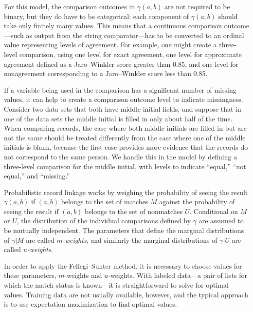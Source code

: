 \documentclass[]{krantz}
\begin{document}
For this model, the comparison outcomes in \(\gamma(a, b)\) are not
required to be binary, but they do have to be categorical: each
component of \(\gamma(a, b)\) should take only finitely many values.
This means that a continuous comparison outcome---such as output from
the string comparator---has to be converted to an ordinal value
representing levels of agreement. For example, one might create a
three-level comparison, using one level for exact agreement, one level
for approximate agreement defined as a Jaro--Winkler score greater than
0.85, and one level for nonagreement corresponding to a Jaro--Winkler
score less than 0.85.

If a variable being used in the comparison has a significant number of
missing values, it can help to create a comparison outcome level to
indicate missingness. Consider two data sets that both have middle
initial fields, and suppose that in one of the data sets the middle
initial is filled in only about half of the time. When comparing
records, the case where both middle initials are filled in but are not
the same should be treated differently from the case where one of the
middle initials is blank, because the first case provides more evidence
that the records do not correspond to the same person. We handle this in
the model by defining a three-level comparison for the middle initial,
with levels to indicate ``equal,'' ``not equal,'' and ``missing.''

Probabilistic record linkage works by weighing the probability of seeing
the result \(\gamma(a, b)\) if \((a, b)\) belongs to the set of matches
\(M\) against the probability of seeing the result if \((a, b)\) belongs
to the set of nonmatches \(U\). Conditional on \(M\) or \(U\), the
distribution of the individual comparisons defined by \(\gamma\) are
assumed to be mutually independent. The parameters that define the
marginal distributions of \(\gamma | M\) are called
\emph{\(m\)-weights}, and similarly the marginal distributions of
\(\gamma | U\) are called \emph{\(u\)-weights}.

In order to apply the Fellegi--Sunter method, it is necessary to choose
values for these parameters, \(m\)-weights and \(u\)-weights. With
labeled data---a pair of lists for which the match status is known---it
is straightforward to solve for optimal values. Training data are not
usually available, however, and the typical approach is to use
expectation maximization to find optimal values.
\end{document}

